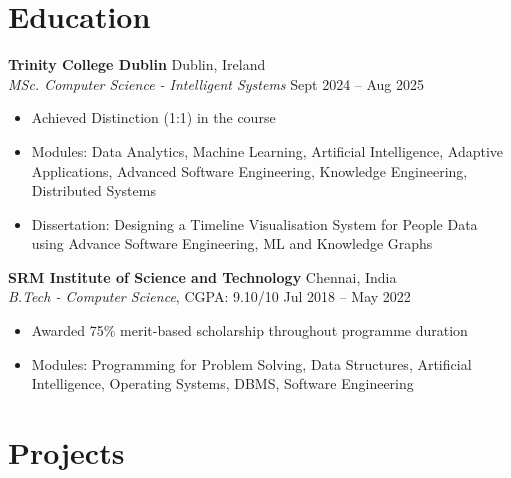 \documentclass[a4paper,9pt]{article}
\begin{document}
\section*{Education}
\textbf{Trinity College Dublin} \hfill Dublin, Ireland \\
\textit{MSc. Computer Science - Intelligent Systems } \hfill Sept 2024 -- Aug 2025
\begin{itemize}[leftmargin=*]
    \item Achieved Distinction (1:1) in the course
    \item Modules: Data Analytics, Machine Learning, Artificial Intelligence, Adaptive Applications, Advanced Software Engineering, Knowledge Engineering, Distributed Systems
    \item Dissertation: Designing a Timeline Visualisation System for People Data using Advance Software Engineering, ML and Knowledge Graphs
\end{itemize}

\textbf{SRM Institute of Science and Technology} \hfill Chennai, India \\
\textit{B.Tech - Computer Science}, CGPA: 9.10/10 \hfill Jul 2018 -- May 2022
\begin{itemize}[leftmargin=*]
    \item Awarded 75\% merit-based scholarship throughout programme duration
    \item Modules: Programming for Problem Solving, Data Structures, Artificial Intelligence, Operating Systems, DBMS, Software Engineering
\end{itemize}

\section*{Projects}
\end{document}
